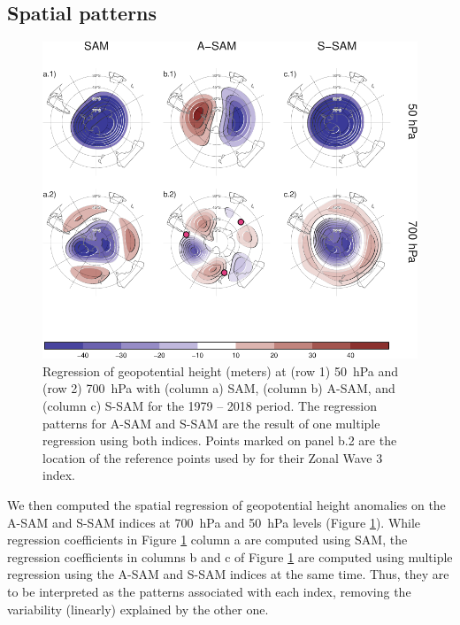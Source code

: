 \documentclass[smallextended]{svjour3}       %
\begin{document}
\hypertarget{spatial}{%
\subsection{Spatial patterns}\label{spatial}}

\begin{figure}
\includegraphics{2d-regr-1} \caption{Regression of geopotential height (meters) at (row 1) 50~hPa and (row 2) 700~hPa with (column a) SAM, (column b) A\nobreakdash-SAM, and (column c) S\nobreakdash-SAM for the 1979 -- 2018 period. The regression patterns for A\nobreakdash-SAM and S\nobreakdash-SAM are the result of one multiple regression using both indices. Points marked on panel b.2 are the location of the reference points used by \cite{raphael2004} for their Zonal Wave 3 index. }\label{fig:2d-regr}
\end{figure}

We then computed the spatial regression of geopotential height anomalies on the A\nobreakdash-SAM and S\nobreakdash-SAM indices at 700~hPa and 50~hPa levels (Figure \ref{fig:2d-regr}).
While regression coefficients in Figure \ref{fig:2d-regr} column a are computed using SAM, the regression coefficients in columns b and c of Figure \ref{fig:2d-regr} are computed using multiple regression using the A\nobreakdash-SAM and S\nobreakdash-SAM indices at the same time.
Thus, they are to be interpreted as the patterns associated with each index, removing the variability (linearly) explained by the other one.
\end{document}
